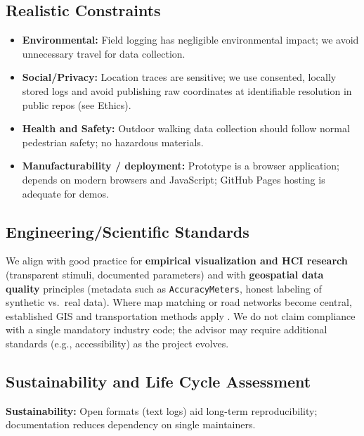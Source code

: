 \documentclass[12pt,a4paper]{article}
\begin{document}
\subsection{Realistic Constraints}

\begin{itemize}[leftmargin=1.5em]
    \item \textbf{Environmental:} Field logging has negligible environmental impact; we avoid unnecessary travel for data collection.
    \item \textbf{Social/Privacy:} Location traces are sensitive; we use consented, locally stored logs and avoid publishing raw coordinates at identifiable resolution in public repos (see Ethics).
    \item \textbf{Health and Safety:} Outdoor walking data collection should follow normal pedestrian safety; no hazardous materials.
    \item \textbf{Manufacturability / deployment:} Prototype is a browser application; depends on modern browsers and JavaScript; GitHub Pages hosting is adequate for demos.
\end{itemize}

\subsection{Engineering/Scientific Standards}

We align with good practice for \textbf{empirical visualization and HCI research} (transparent stimuli, documented parameters) and with \textbf{geospatial data quality} principles (metadata such as \texttt{AccuracyMeters}, honest labeling of synthetic vs.\ real data). Where map matching or road networks become central, established GIS and transportation methods apply \cite{MillardBall2019}. We do not claim compliance with a single mandatory industry code; the advisor may require additional standards (e.g., accessibility) as the project evolves.

\subsection{Sustainability and Life Cycle Assessment}

\noindent\textbf{Sustainability:} Open formats (text logs) aid long-term reproducibility; documentation reduces dependency on single maintainers.
\end{document}
